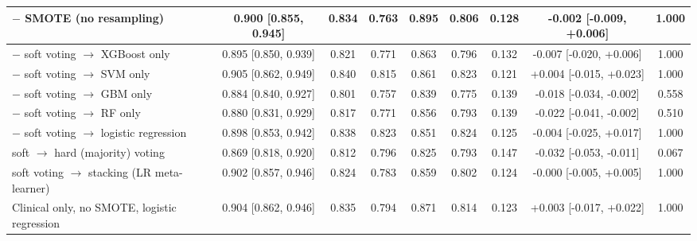 \begin{table}[!t]
\begin{adjustbox}{max width=\linewidth}
\begin{tabular}{lcccccccc}
\midrule
$-$ SMOTE (no resampling) & 0.900 [0.855, 0.945] & 0.834 & 0.763 & 0.895 & 0.806 & 0.128 & -0.002 [-0.009, +0.006] & 1.000 \\
\midrule
$-$ soft voting $\rightarrow$ XGBoost only & 0.895 [0.850, 0.939] & 0.821 & 0.771 & 0.863 & 0.796 & 0.132 & -0.007 [-0.020, +0.006] & 1.000 \\
$-$ soft voting $\rightarrow$ SVM only & 0.905 [0.862, 0.949] & 0.840 & 0.815 & 0.861 & 0.823 & 0.121 & +0.004 [-0.015, +0.023] & 1.000 \\
$-$ soft voting $\rightarrow$ GBM only & 0.884 [0.840, 0.927] & 0.801 & 0.757 & 0.839 & 0.775 & 0.139 & -0.018 [-0.034, -0.002] & 0.558 \\
$-$ soft voting $\rightarrow$ RF only & 0.880 [0.831, 0.929] & 0.817 & 0.771 & 0.856 & 0.793 & 0.139 & -0.022 [-0.041, -0.002] & 0.510 \\
$-$ soft voting $\rightarrow$ logistic regression & 0.898 [0.853, 0.942] & 0.838 & 0.823 & 0.851 & 0.824 & 0.125 & -0.004 [-0.025, +0.017] & 1.000 \\
soft $\rightarrow$ hard (majority) voting & 0.869 [0.818, 0.920] & 0.812 & 0.796 & 0.825 & 0.793 & 0.147 & -0.032 [-0.053, -0.011] & 0.067 \\
soft voting $\rightarrow$ stacking (LR meta-learner) & 0.902 [0.857, 0.946] & 0.824 & 0.783 & 0.859 & 0.802 & 0.124 & -0.000 [-0.005, +0.005] & 1.000 \\
\midrule
Clinical only, no SMOTE, logistic regression & 0.904 [0.862, 0.946] & 0.835 & 0.794 & 0.871 & 0.814 & 0.123 & +0.003 [-0.017, +0.022] & 1.000 \\
\bottomrule
\end{tabular}
\end{adjustbox}
\end{table}
